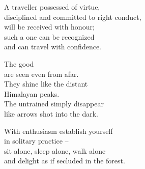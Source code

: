 A traveller possessed of virtue,\\
disciplined and committed to right conduct,\\
will be received with honour;\\
such a one can be recognized\\
and can travel with confidence.


The good\\
are seen even from afar.\\
They shine like the distant\\
Himalayan peaks.\\
The untrained simply disappear\\
like arrows shot into the dark.


With enthusiasm establish yourself\\
in solitary practice --\\
sit alone, sleep alone, walk alone\\
and delight as if secluded in the forest.

